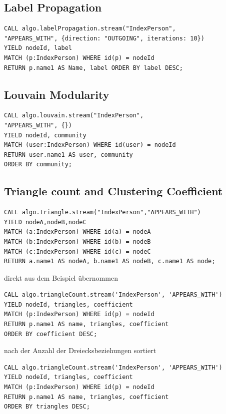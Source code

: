 \documentclass[ngerman,]{scrreprt}
\begin{document}
\subsection{Label Propagation}\label{label-propagation}

\begin{verbatim}
CALL algo.labelPropagation.stream("IndexPerson",
"APPEARS_WITH", {direction: "OUTGOING", iterations: 10})
YIELD nodeId, label
MATCH (p:IndexPerson) WHERE id(p) = nodeId
RETURN p.name1 AS Name, label ORDER BY label DESC;
\end{verbatim}

\subsection{Louvain Modularity}\label{louvain-modularity}

\begin{verbatim}
CALL algo.louvain.stream("IndexPerson",
"APPEARS_WITH", {})
YIELD nodeId, community
MATCH (user:IndexPerson) WHERE id(user) = nodeId
RETURN user.name1 AS user, community
ORDER BY community;
\end{verbatim}

\subsection{Triangle count and Clustering Coefficient}\label{triangle-count-and-clustering-coefficient}

\begin{verbatim}
CALL algo.triangle.stream("IndexPerson","APPEARS_WITH")
YIELD nodeA,nodeB,nodeC
MATCH (a:IndexPerson) WHERE id(a) = nodeA
MATCH (b:IndexPerson) WHERE id(b) = nodeB
MATCH (c:IndexPerson) WHERE id(c) = nodeC
RETURN a.name1 AS nodeA, b.name1 AS nodeB, c.name1 AS node;
\end{verbatim}

direkt aus dem Beispiel übernommen

\begin{verbatim}
CALL algo.triangleCount.stream('IndexPerson', 'APPEARS_WITH')
YIELD nodeId, triangles, coefficient
MATCH (p:IndexPerson) WHERE id(p) = nodeId
RETURN p.name1 AS name, triangles, coefficient
ORDER BY coefficient DESC;
\end{verbatim}

nach der Anzahl der Dreiecksbeziehungen sortiert

\begin{verbatim}
CALL algo.triangleCount.stream('IndexPerson', 'APPEARS_WITH')
YIELD nodeId, triangles, coefficient
MATCH (p:IndexPerson) WHERE id(p) = nodeId
RETURN p.name1 AS name, triangles, coefficient
ORDER BY triangles DESC;
\end{verbatim}
\end{document}
